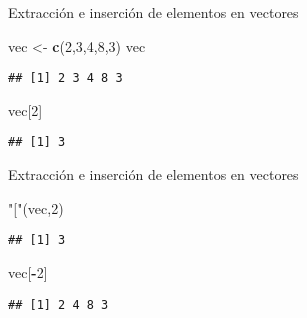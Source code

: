\documentclass[ignorenonframetext,]{beamer}
\newenvironment{Shaded}{\begin{snugshade}}{\end{snugshade}}
\newcommand{\KeywordTok}[1]{\textcolor[rgb]{0.13,0.29,0.53}{\textbf{#1}}}
\newcommand{\DecValTok}[1]{\textcolor[rgb]{0.00,0.00,0.81}{#1}}
\newcommand{\StringTok}[1]{\textcolor[rgb]{0.31,0.60,0.02}{#1}}
\newcommand{\OperatorTok}[1]{\textcolor[rgb]{0.81,0.36,0.00}{\textbf{#1}}}
\newcommand{\NormalTok}[1]{#1}
\begin{document}
\begin{frame}[fragile]{Extracción e inserción de elementos en vectores}

\begin{Shaded}
\begin{Highlighting}[]
\NormalTok{vec <-}\StringTok{ }\KeywordTok{c}\NormalTok{(}\DecValTok{2}\NormalTok{,}\DecValTok{3}\NormalTok{,}\DecValTok{4}\NormalTok{,}\DecValTok{8}\NormalTok{,}\DecValTok{3}\NormalTok{)}
\NormalTok{vec}
\end{Highlighting}
\end{Shaded}
\pause
\begin{verbatim}
## [1] 2 3 4 8 3
\end{verbatim}

\begin{Shaded}
\begin{Highlighting}[]
\NormalTok{vec[}\DecValTok{2}\NormalTok{]}
\end{Highlighting}
\end{Shaded}
\pause
\begin{verbatim}
## [1] 3
\end{verbatim}

\end{frame}

\begin{frame}[fragile]{Extracción e inserción de elementos en vectores}

\begin{Shaded}
\begin{Highlighting}[]
\StringTok{"["}\NormalTok{(vec,}\DecValTok{2}\NormalTok{)}
\end{Highlighting}
\end{Shaded}
\pause
\begin{verbatim}
## [1] 3
\end{verbatim}

\begin{Shaded}
\begin{Highlighting}[]
\NormalTok{vec[}\OperatorTok{-}\DecValTok{2}\NormalTok{]}
\end{Highlighting}
\end{Shaded}
\pause
\begin{verbatim}
## [1] 2 4 8 3
\end{verbatim}

\end{frame}
\end{document}
